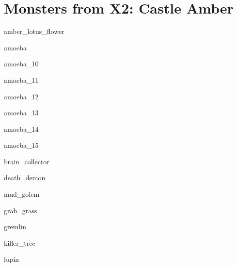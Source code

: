 \documentclass[a4paper,serif]{module}
\begin{document}
\part{Monsters from X2: Castle Amber}

\begin{newmonster}{amber_lotus_flower}\end{newmonster}
\begin{newmonster}{amoeba}\end{newmonster}
\begin{newmonster}{amoeba_10}\end{newmonster}
\begin{newmonster}{amoeba_11}\end{newmonster}
\begin{newmonster}{amoeba_12}\end{newmonster}
\begin{newmonster}{amoeba_13}\end{newmonster}
\begin{newmonster}{amoeba_14}\end{newmonster}
\begin{newmonster}{amoeba_15}\end{newmonster}
\begin{newmonster}{brain_collector}\end{newmonster}
\begin{newmonster}{death_demon}\end{newmonster}
\begin{newmonster}{mud_golem}\end{newmonster}
\begin{newmonster}{grab_grass}\end{newmonster}
\begin{newmonster}{gremlin}\end{newmonster}
\begin{newmonster}{killer_tree}\end{newmonster}
\begin{newmonster}{lupin}\end{newmonster}
\end{document}

